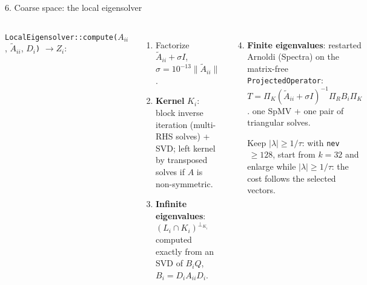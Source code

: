 \documentclass[aspectratio=169,10pt]{beamer}
\newcommand{\code}[1]{\texttt{#1}}
\newcommand{\muted}[1]{{\color{ink2}#1}}
\newcommand\Weig{{27}{-44}{82}{-17}}
\newcommand\mapsec[2]{\expandafter\cmsection#1{#2}}
\newcommand\mapbadge[1]{%
  \begin{tikzpicture}[remember picture,overlay]
    \node[anchor=north east,fill=white,rounded corners=1.2pt,inner sep=0.9pt]
      at ($(current page.north east)+(-1.8mm,-0.75mm)$) {\expandafter\cmthumb#1{17mm}};
  \end{tikzpicture}}
\begin{document}
\begin{frame}{6. Coarse space: the local eigensolver}
  \small
  \begin{columns}[T,onlytextwidth]
    \code{LocalEigensolver::compute(}$A_{ii}$, $\widetilde A_{ii}$, $D_i$\code{)} $\to Z_i$:
    \begin{enumerate}
      \item Factorize $\widetilde A_{ii}+\sigma I$, $\sigma=10^{-13}\|\widetilde A_{ii}\|$.
      \item \textbf{Kernel} $K_i$: block inverse iteration (multi-RHS solves) + SVD; left kernel by
            transposed solves if $A$ is non-symmetric.
      \item \textbf{Infinite eigenvalues}: $(L_i\cap K_i)^{\perp_{K_i}}$ computed \alert{exactly} from an SVD
            of $B_iQ$, $B_i=D_iA_{ii}D_i$.
    \end{enumerate}
    \begin{enumerate}
      \setcounter{enumi}{3}
      \item \textbf{Finite eigenvalues}: restarted Arnoldi (Spectra) on the matrix-free
            \code{ProjectedOperator}: $T=\Pi_K(\widetilde A_{ii}+\sigma I)^{-1}\Pi_RB_i\Pi_K$. 
            one SpMV + one pair of triangular solves. 
            
            \footnotesize
            \muted{Keep $|\lambda|\ge1/\tau$: with \texttt{nev}$\,\ge128$, start from $k=32$ and enlarge while 
            $|\lambda|\ge1/\tau$: the cost follows the \alert{selected} vectors.}
    \end{enumerate}
  \end{columns}
  \centering
  
  \vspace{3mm}
  \mapsec\Weig{0.4\linewidth}
\end{frame}
\end{document}
